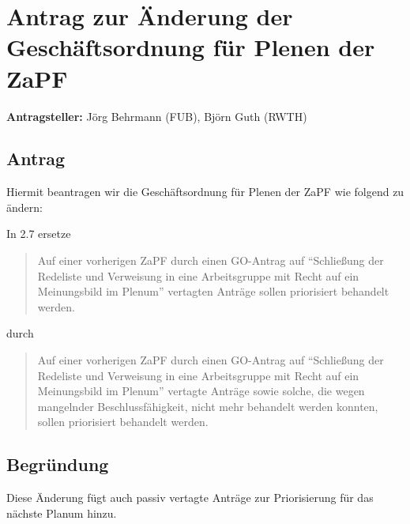 \documentclass[draft,10pt,oneside]{scrartcl}
\begin{document}
\section*{Antrag zur Änderung der Geschäftsordnung für Plenen der ZaPF}

\textbf{Antragsteller:} Jörg Behrmann (FUB), Björn Guth (RWTH)

\subsection*{Antrag}

Hiermit beantragen wir die Geschäftsordnung für Plenen der ZaPF wie folgend zu
ändern:

In 2.7 ersetze
\begin{quote}
	Auf einer vorherigen ZaPF durch einen GO-Antrag auf ``Schließung der
	Redeliste und Verweisung in eine Arbeitsgruppe mit Recht auf ein
	Meinungsbild im Plenum'' vertagten Anträge sollen priorisiert behandelt
	werden.
\end{quote}
durch
\begin{quote}
	Auf einer vorherigen ZaPF durch einen GO-Antrag auf ``Schließung der
	Redeliste und Verweisung in eine Arbeitsgruppe mit Recht auf ein
	Meinungsbild im Plenum'' vertagte Anträge sowie solche, die wegen mangelnder
	Beschlussfähigkeit, nicht mehr behandelt werden konnten, sollen priorisiert
	behandelt werden.
\end{quote}

\subsection*{Begründung}
Diese Änderung fügt auch passiv vertagte Anträge zur Priorisierung für das
nächste Planum hinzu.
\end{document}
